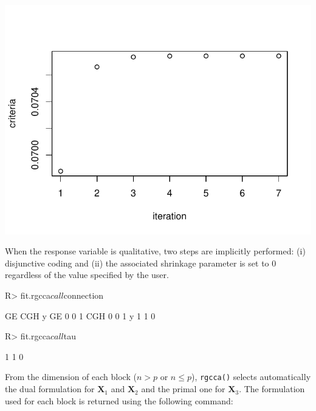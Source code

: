 \documentclass[
]{jss}
\begin{document}
\begin{CodeChunk}
\begin{center}\includegraphics{RGCCA_21022023_files/figure-latex/unnamed-chunk-33-2} \end{center}

\end{CodeChunk}

\normalsize

When the response variable is qualitative, two steps are implicitly
performed: (i) disjunctive coding and (ii) the associated shrinkage
parameter is set to \(0\) regardless of the value specified by the user.

\footnotesize

\begin{CodeChunk}
\begin{CodeInput}
R> fit.rgcca$call$connection
\end{CodeInput}
\begin{CodeOutput}
    GE CGH y
GE   0   0 1
CGH  0   0 1
y    1   1 0
\end{CodeOutput}
\begin{CodeInput}
R> fit.rgcca$call$tau
\end{CodeInput}
\begin{CodeOutput}
[1] 1 1 0
\end{CodeOutput}
\end{CodeChunk}

\normalsize

From the dimension of each block (\(n>p\) or \(n\leq p\)),
\texttt{rgcca()} selects automatically the dual formulation for
\(\mathbf{X}_1\) and \(\mathbf{X}_2\) and the primal one for
\(\mathbf{X}_3\). The formulation used for each block is returned using
the following command:
\end{document}
